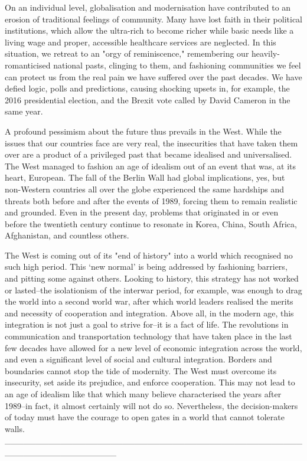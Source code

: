    On an individual level, globalisation and modernisation have
   contributed to an erosion of traditional feelings of community. Many
   have lost faith in their political institutions, which allow the
   ultra-rich to become richer while basic needs like a living wage and
   proper, accessible healthcare services are neglected. In this
   situation, we retreat to an "orgy of reminiscence," remembering our
   heavily-romanticised national pasts, clinging to them, and fashioning
   communities we feel can protect us from the real pain we have suffered
   over the past decades. We have defied logic, polls and predictions,
   causing shocking upsets in, for example, the 2016 presidential
   election, and the Brexit vote called by David Cameron in the same
   year.

   A profound pessimism about the future thus prevails in the West. While
   the issues that our countries face are very real, the insecurities that
   have taken them over are a product of a privileged past that became
   idealised and universalised. The West managed to fashion an age of
   idealism out of an event that was, at its heart, European. The fall of
   the Berlin Wall had global implications, yes, but non-Western countries
   all over the globe experienced the same hardships and threats both
   before and after the events of 1989, forcing them to remain realistic
   and grounded. Even in the present day, problems that originated in or
   even before the twentieth century continue to resonate in Korea, China,
   South Africa, Afghanistan, and countless others.

   The West is coming out of its "end of history" into a world which
   recognised no such high period. This `new normal' is being addressed by
   fashioning barriers, and pitting some against others. Looking to
   history, this strategy has not worked or lasted--the isolationism of
   the interwar period, for example, was enough to drag the world into a
   second world war, after which world leaders realised the merits and
   necessity of cooperation and integration. Above all, in the modern age,
   this integration is not just a goal to strive for--it is a fact of
   life. The revolutions in communication and transportation technology
   that have taken place in the last few decades have allowed for a new
   level of economic integration across the world, and even a significant
   level of social and cultural integration. Borders and boundaries cannot
   stop the tide of modernity. The West must overcome its insecurity, set
   aside its prejudice, and enforce cooperation. This may not lead to an
   age of idealism like that which many believe characterised the years
   after 1989--in fact, it almost certainly will not do so. Nevertheless,
   the decision-makers of today must have the courage to open gates in a
   world that cannot tolerate walls.
     __________________________________________________________________

